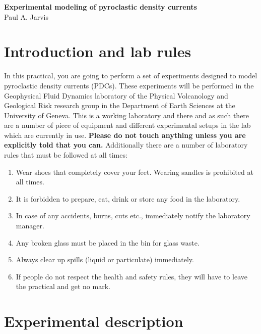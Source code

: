 \documentclass[]{article}
\theoremstyle{definition}
\begin{document}
\begin{center}
{\textbf{Experimental modeling of pyroclastic density currents}}\\
Paul A. Jarvis\\ %
\end{center}

\vspace{0.2 cm}

\section{Introduction and lab rules}
\label{sec:lab_rules}

In this practical, you are going to perform a set of experiments designed to model pyroclastic density currents (PDCs). These experiments will be performed in the Geophysical Fluid Dynamics laboratory of the Physical Volcanology and Geological Risk research group in the Department of Earth Sciences at the University of Geneva. This is a working laboratory and there and as such there are a number of piece of equipment and different experimental setups in the lab which are currently in use. \textbf{Please do not touch anything unless you are explicitly told that you can.} Additionally there are a number of laboratory rules that must be followed at all times:

\begin{enumerate}
\item Wear shoes that completely cover your feet. Wearing sandles is prohibited at all times. \\
\item It is forbidden to prepare, eat, drink or store any food in the laboratory. \\
\item In case of any accidents, burns, cuts etc., immediately notify the laboratory manager. \\
\item Any broken glass must be placed in the bin for glass waste.  \\
\item Always clear up spills (liquid or particulate) immediately. \\
\item If people do not respect the health and safety rules, they will have to leave the practical and get no mark. \\
\end{enumerate}

\section{Experimental description}
\label{sec:exp}
\end{document}
